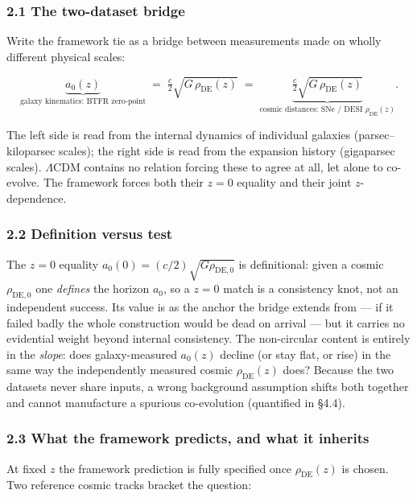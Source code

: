 \documentclass[
]{article}
\begin{document}
\subsubsection{2.1 The two-dataset bridge}\label{the-two-dataset-bridge}

Write the framework tie as a bridge between measurements made on wholly
different physical scales:

\[\underbrace{a_0(z)}_{\text{galaxy kinematics: BTFR zero-point}}\;=\;\tfrac{c}{2}\sqrt{G\,\rho_\mathrm{DE}(z)}\;=\;\underbrace{\tfrac{c}{2}\sqrt{G\,\rho_\mathrm{DE}(z)}}_{\text{cosmic distances: SNe / DESI }\rho_\mathrm{DE}(z)}.\]

The left side is read from the internal dynamics of individual galaxies
(parsec--kiloparsec scales); the right side is read from the expansion
history (gigaparsec scales). \(\Lambda\)CDM contains no relation forcing
these to agree at all, let alone to co-evolve. The framework forces both
their \(z=0\) equality and their joint \(z\)-dependence.

\subsubsection{2.2 Definition versus test}\label{definition-versus-test}

The \(z=0\) equality \(a_0(0)=(c/2)\sqrt{G\rho_\mathrm{DE,0}}\) is
definitional: given a cosmic \(\rho_\mathrm{DE,0}\) one \emph{defines} the
horizon \(a_0\), so a \(z=0\) match is a consistency knot, not an
independent success. Its value is as the anchor the bridge extends from
--- if it failed badly the whole construction would be dead on arrival
--- but it carries no evidential weight beyond internal consistency. The
non-circular content is entirely in the \emph{slope}: does
galaxy-measured \(a_0(z)\) decline (or stay flat, or rise) in the same
way the independently measured cosmic \(\rho_\mathrm{DE}(z)\) does? Because
the two datasets never share inputs, a wrong background assumption
shifts both together and cannot manufacture a spurious co-evolution
(quantified in §4.4).

\subsubsection{2.3 What the framework predicts, and what it
inherits}\label{what-the-framework-predicts-and-what-it-inherits}

At fixed \(z\) the framework prediction is fully specified once
\(\rho_\mathrm{DE}(z)\) is chosen. Two reference cosmic tracks bracket the
question:
\end{document}
